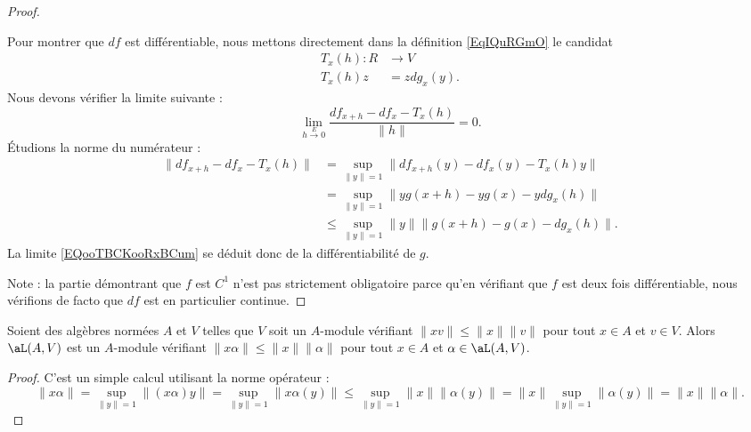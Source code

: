 \begin{proof}
\begin{subproof}
            Pour montrer que \( df\) est différentiable, nous mettons directement dans la définition \eqref{EqIQuRGmO} le candidat
            \begin{equation}
                \begin{aligned}
                    T_x(h)\colon R&\to V \\
                    T_x(h)z&=zdg_x(y). 
                \end{aligned}
            \end{equation}
            Nous devons vérifier la limite suivante :
            \begin{equation}        \label{EQooTBCKooRxBCum}
                \lim_{h\stackrel{E}{\longrightarrow} 0} \frac{ df_{x+h}-df_x-T_x(h) }{ \| h \| }=0.
            \end{equation}
            Étudions la norme du numérateur :
            \begin{subequations}
                \begin{align}
                    \| df_{x+h}-df_x-T_x(h) \|&=\sup_{\| y \|=1}\| df_{x+h}(y)-df_x(y)-T_x(h)y \|\\
                    &=\sup_{\| y \|=1}\| yg(x+h)-yg(x)-ydg_x(h) \|\\
                    &\leq \sup_{\| y \|=1}\| y \| \| g(x+h)-g(x)-dg_x(h) \|.
                \end{align}
            \end{subequations}
            La limite \eqref{EQooTBCKooRxBCum} se déduit donc de la différentiabilité de \( g\).
    \end{subproof}
    Note : la partie démontrant que \( f\) est \( C^1\) n'est pas strictement obligatoire parce qu'en vérifiant que \( f\) est deux fois différentiable, nous vérifions de facto que \( df\) est en particulier continue.
\end{proof}

\begin{lemma}   \label{LEMooTUWQooMCCDcm}
    Soient des algèbres normées \( A\) et \( V\) telles que \( V\) soit un \( A\)-module vérifiant \( \| xv \|\leq \| x \|\| v \|\) pour tout \( x\in A\) et \( v\in V\). Alors \( \aL(A,V)\) est un \( A\)-module vérifiant \( \| x\alpha \|\leq \| x \|\|\alpha  \|\) pour tout \( x\in A\) et \( \alpha\in \aL(A,V)\).
\end{lemma}

\begin{proof}
    C'est un simple calcul utilisant la norme opérateur :
    \begin{equation}
            \| x\alpha \|=\sup_{\| y \|=1}\| (x\alpha)y \|
            =\sup_{\| y \|=1}\| x\alpha(y) \|
            \leq \sup_{\| y \|=1}\| x \|\| \alpha(y) \|
            =\| x \|\sup_{\| y \|=1}\| \alpha(y) \|
            =\| x \|\| \alpha \|.
    \end{equation}
\end{proof}

